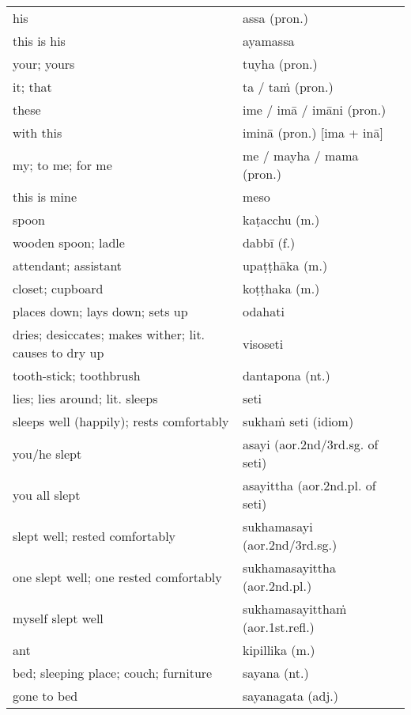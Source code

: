 \documentclass[11pt,oneside]{memoir}
\begin{document}
\begin{center}
\begin{tabular}{ll}
his & assa (pron.)\\[0pt]
this is his & ayamassa\\[0pt]
your; yours & tuyha (pron.)\\[0pt]
it; that & ta / taṁ (pron.)\\[0pt]
these & ime / imā / imāni (pron.)\\[0pt]
with this & iminā (pron.) [ima + inā]\\[0pt]
my; to me; for me & me / mayha / mama (pron.)\\[0pt]
this is mine & meso\\[0pt]
spoon & kaṭacchu (m.)\\[0pt]
wooden spoon; ladle & dabbī (f.)\\[0pt]
attendant; assistant & upaṭṭhāka (m.)\\[0pt]
closet; cupboard & koṭṭhaka (m.)\\[0pt]
places down; lays down; sets up & odahati\\[0pt]
dries; desiccates; makes wither; lit. causes to dry up & visoseti\\[0pt]
tooth-stick; toothbrush & dantapona (nt.)\\[0pt]
lies; lies around; lit. sleeps & seti\\[0pt]
sleeps well (happily); rests comfortably & sukhaṁ seti (idiom)\\[0pt]
you/he slept & asayi (aor.2nd/3rd.sg. of seti)\\[0pt]
you all slept & asayittha (aor.2nd.pl. of seti)\\[0pt]
slept well; rested comfortably & sukhamasayi (aor.2nd/3rd.sg.)\\[0pt]
one slept well; one rested comfortably & sukhamasayittha (aor.2nd.pl.)\\[0pt]
myself slept well & sukhamasayitthaṁ (aor.1st.refl.)\\[0pt]
ant & kipillika (m.)\\[0pt]
bed; sleeping place; couch; furniture & sayana (nt.)\\[0pt]
gone to bed & sayanagata (adj.)\\[0pt]
\end{tabular}
\end{center}

\renewcommand{\arraystretch}{1.8}
\end{document}
